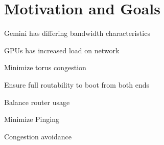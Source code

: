 \section{Motivation and Goals}

Gemini has differing bandwidth characteristics

GPUs has increased load on network

Minimize torus congestion

Ensure full routability to boot from both ends

Balance router usage

Minimize Pinging

Congestion avoidance

